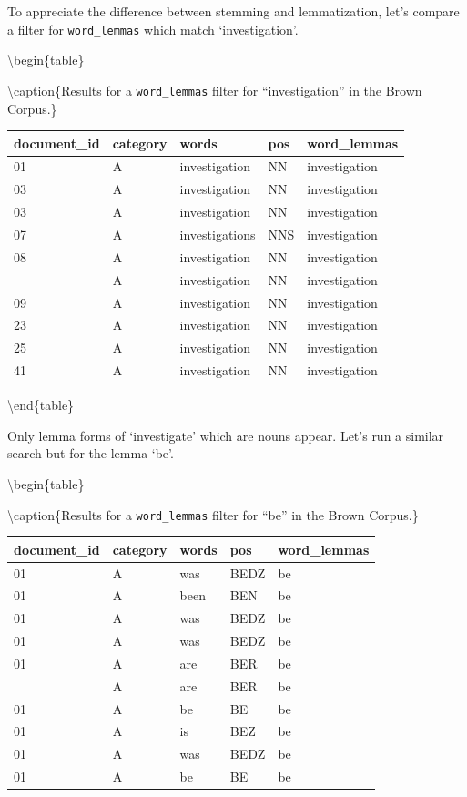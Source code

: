 \documentclass[
]{article}
\begin{document}
To appreciate the difference between stemming and lemmatization, let's compare a filter for \texttt{word\_lemmas} which match `investigation'.

\textbackslash begin\{table\}

\textbackslash caption\{\label{tab:recoding-lemmatization-brown-investigation}Results for a \texttt{word\_lemmas} filter for ``investigation'' in the Brown Corpus.\}
\centering

\begin{tabular}[t]{lllll}
\toprule
document\_id & category & words & pos & word\_lemmas\\
\midrule
01 & A & investigation & NN & investigation\\
03 & A & investigation & NN & investigation\\
03 & A & investigation & NN & investigation\\
07 & A & investigations & NNS & investigation\\
08 & A & investigation & NN & investigation\\
\addlinespace
09 & A & investigation & NN & investigation\\
09 & A & investigation & NN & investigation\\
23 & A & investigation & NN & investigation\\
25 & A & investigation & NN & investigation\\
41 & A & investigation & NN & investigation\\
\bottomrule
\end{tabular}

\textbackslash end\{table\}

Only lemma forms of `investigate' which are nouns appear. Let's run a similar search but for the lemma `be'.

\textbackslash begin\{table\}

\textbackslash caption\{\label{tab:recoding-lemmatization-brown-be}Results for a \texttt{word\_lemmas} filter for ``be'' in the Brown Corpus.\}
\centering

\begin{tabular}[t]{lllll}
\toprule
document\_id & category & words & pos & word\_lemmas\\
\midrule
01 & A & was & BEDZ & be\\
01 & A & been & BEN & be\\
01 & A & was & BEDZ & be\\
01 & A & was & BEDZ & be\\
01 & A & are & BER & be\\
\addlinespace
01 & A & are & BER & be\\
01 & A & be & BE & be\\
01 & A & is & BEZ & be\\
01 & A & was & BEDZ & be\\
01 & A & be & BE & be\\
\bottomrule
\end{tabular}
\end{document}
